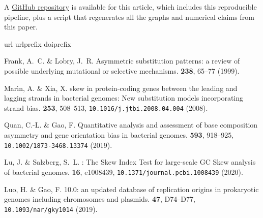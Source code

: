 \documentclass[fleqn,10pt]{wlscirep}
\begin{document}
A \href{https://github.com/berthubert/skewdb-articles}{GitHub repository} is available for this article, which includes this reproducible pipeline, plus a script that regenerates all the graphs and numerical claims from this paper. 

\begin{thebibliography}{10}
\expandafter\ifx\csname url\endcsname\relax
  \def\url#1{\texttt{#1}}\fi
\expandafter\ifx\csname urlprefix\endcsname\relax\def\urlprefix{URL }\fi
\expandafter\ifx\csname doiprefix\endcsname\relax\def\doiprefix{DOI: }\fi
\providecommand{\bibinfo}[2]{#2}
\providecommand{\eprint}[2][]{\url{#2}}

\bibinfo{author}{Frank, A.~C.} \& \bibinfo{author}{Lobry, J.~R.}
\newblock \bibinfo{journal}{\bibinfo{title}{Asymmetric substitution patterns: a
  review of possible underlying mutational or selective mechanisms.}}
 \textbf{\bibinfo{volume}{238}},
  \bibinfo{pages}{65--77} (\bibinfo{year}{1999}).

\bibinfo{author}{Mar{\'{\i}}n, A.} \& \bibinfo{author}{Xia, X.}
\newblock \bibinfo{journal}{\bibinfo{title}{{GC} skew in protein-coding genes
  between the leading and lagging strands in bacterial genomes: New
  substitution models incorporating strand bias}}.
  \textbf{\bibinfo{volume}{253}}, \bibinfo{pages}{508--513},
  \url{10.1016/j.jtbi.2008.04.004} (\bibinfo{year}{2008}).

\bibinfo{author}{Quan, C.-L.} \& \bibinfo{author}{Gao, F.}
\newblock \bibinfo{journal}{\bibinfo{title}{Quantitative analysis and
  assessment of base composition asymmetry and gene orientation bias in
  bacterial genomes}}.
  \textbf{\bibinfo{volume}{593}}, \bibinfo{pages}{918--925},
  \url{10.1002/1873-3468.13374} (\bibinfo{year}{2019}).

\bibinfo{author}{Lu, J.} \& \bibinfo{author}{Salzberg, S.~L.}
\newblock \bibinfo{journal}{\bibinfo{title}{{SkewIT}: {The} {Skew} {Index}
  {Test} for large-scale {GC} {Skew} analysis of bacterial genomes}}.
  \textbf{\bibinfo{volume}{16}}, \bibinfo{pages}{e1008439},
  \url{10.1371/journal.pcbi.1008439} (\bibinfo{year}{2020}).

\bibinfo{author}{Luo, H.} \& \bibinfo{author}{Gao, F.}
\newblock \bibinfo{journal}{\bibinfo{title}{{DoriC} 10.0: an updated database
  of replication origins in prokaryotic genomes including chromosomes and
  plasmids}}.
  \textbf{\bibinfo{volume}{47}}, \bibinfo{pages}{D74--D77},
  \url{10.1093/nar/gky1014} (\bibinfo{year}{2019}).


\end{thebibliography}
\end{document}
